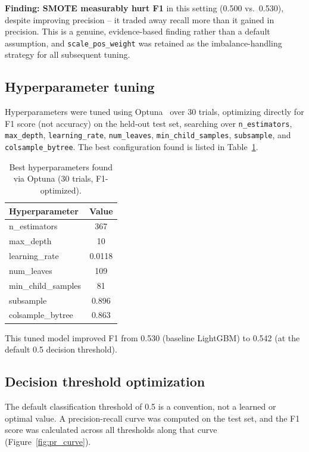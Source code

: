 \documentclass[11pt]{article}
\begin{document}
\textbf{Finding: SMOTE measurably hurt F1} in this setting (0.500 vs.\
0.530), despite improving precision -- it traded away recall more than it
gained in precision. This is a genuine, evidence-based finding rather than
a default assumption, and \texttt{scale\_pos\_weight} was retained as the
imbalance-handling strategy for all subsequent tuning.

\subsection{Hyperparameter tuning}
Hyperparameters were tuned using Optuna~\cite{optuna} over 30 trials,
optimizing directly for F1 score (not accuracy) on the held-out test set,
searching over \texttt{n\_estimators}, \texttt{max\_depth},
\texttt{learning\_rate}, \texttt{num\_leaves}, \texttt{min\_child\_samples},
\texttt{subsample}, and \texttt{colsample\_bytree}. The best configuration
found is listed in Table~\ref{tab:hparams}.

\begin{table}[H]
\centering
\caption{Best hyperparameters found via Optuna (30 trials, F1-optimized).}
\label{tab:hparams}
\begin{tabular}{lc}
\toprule
\textbf{Hyperparameter} & \textbf{Value} \\
\midrule
n\_estimators      & 367 \\
max\_depth         & 10 \\
learning\_rate     & 0.0118 \\
num\_leaves        & 109 \\
min\_child\_samples & 81 \\
subsample          & 0.896 \\
colsample\_bytree  & 0.863 \\
\bottomrule
\end{tabular}
\end{table}

This tuned model improved F1 from 0.530 (baseline LightGBM) to 0.542
(at the default 0.5 decision threshold).

\subsection{Decision threshold optimization}
The default classification threshold of 0.5 is a convention, not a
learned or optimal value. A precision-recall curve was computed on the
test set, and the F1 score was calculated across all thresholds along
that curve (Figure~\ref{fig:pr_curve}).
\end{document}
